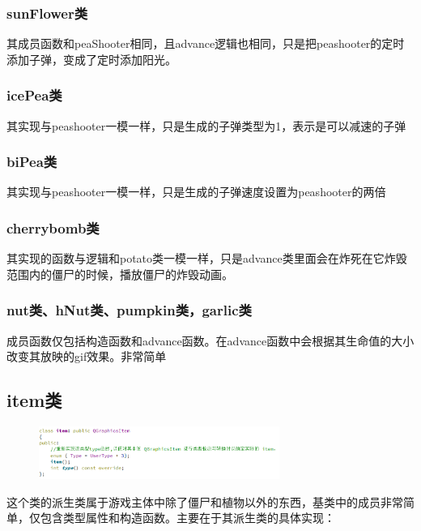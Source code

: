 \documentclass[12pt,a4paper,UTF8]{article}
\begin{document}
    \subsubsection{sunFlower类}
      其成员函数和peaShooter相同，且advance逻辑也相同，只是把peashooter的定时添加子弹，变成了定时添加阳光。
    \subsubsection{icePea类}
      其实现与peashooter一模一样，只是生成的子弹类型为1，表示是可以减速的子弹
    \subsubsection{biPea类}
    其实现与peashooter一模一样，只是生成的子弹速度设置为peashooter的两倍
    \subsubsection{cherrybomb类}
      其实现的函数与逻辑和potato类一模一样，只是advance类里面会在炸死在它炸毁范围内的僵尸的时候，播放僵尸的炸毁动画。
    \subsubsection{nut类、hNut类、pumpkin类，garlic类}
      成员函数仅包括构造函数和advance函数。在advance函数中会根据其生命值的大小改变其放映的gif效果。非常简单

    \subsection{item类}
    \begin{figure}[H]
      \centering
    \includegraphics[width=0.7\textwidth]{figure/item.png}
    \end{figure}
    这个类的派生类属于游戏主体中除了僵尸和植物以外的东西，基类中的成员非常简单，仅包含类型属性和构造函数。主要在于其派生类的具体实现：
\end{document}
